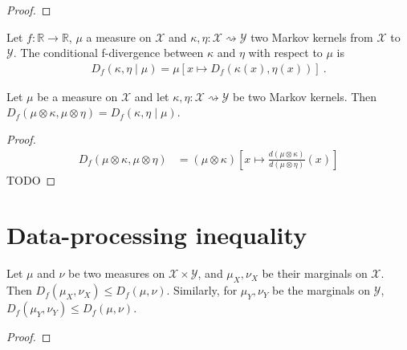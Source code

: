 \begin{proof}
\end{proof}

\begin{definition}
  \label{def:condFDiv}
  Let $f : \mathbb{R} \to \mathbb{R}$, $\mu$ a measure on $\mathcal X$ and $\kappa, \eta : \mathcal X \rightsquigarrow \mathcal Y$ two Markov kernels from $\mathcal X$ to $\mathcal Y$. The conditional f-divergence between $\kappa$ and $\eta$ with respect to $\mu$ is
  \begin{align*}
  D_f(\kappa, \eta \mid \mu) = \mu\left[x \mapsto D_f(\kappa(x), \eta(x))\right] \: .
  \end{align*}
\end{definition}

\begin{lemma}
  \label{lem:fDiv_compProd_left}
  Let $\mu$ be a measure on $\mathcal X$ and let $\kappa, \eta : \mathcal X \rightsquigarrow \mathcal Y$ be two Markov kernels.
  Then $D_f(\mu \otimes \kappa, \mu \otimes \eta) = D_f(\kappa, \eta \mid \mu)$.
\end{lemma}

\begin{proof}
\begin{align*}
D_f(\mu \otimes \kappa, \mu \otimes \eta)
&= (\mu \otimes \kappa)\left[ x \mapsto \frac{d (\mu \otimes \kappa)}{d (\mu \otimes \eta)}(x) \right]
\end{align*}
TODO
\end{proof}

\section{Data-processing inequality}

\begin{theorem}[Marginals]
  \label{thm:fDiv_fst_le}
  Let $\mu$ and $\nu$ be two measures on $\mathcal X \times \mathcal Y$, and $\mu_X, \nu_X$ be their marginals on $\mathcal X$.
  Then $D_f(\mu_X, \nu_X) \le D_f(\mu, \nu)$.
  Similarly, for $\mu_Y, \nu_Y$ be the marginals on $\mathcal Y$, $D_f(\mu_Y, \nu_Y) \le D_f(\mu, \nu)$.
\end{theorem}

\begin{proof}
\end{proof}

